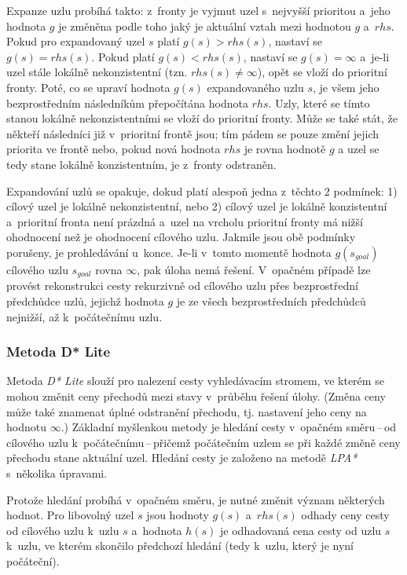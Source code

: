 Expanze uzlu probíhá takto: z~fronty je vyjmut uzel s~nejvyšší prioritou a~jeho hodnota $g$ je změněna podle toho jaký je aktuální vztah mezi hodnotou $g$ a~$rhs$. Pokud pro expandovaný uzel $s$ platí $g(s) > rhs(s)$, nastaví se $g(s) = rhs(s)$. Pokud platí $g(s) < rhs(s)$, nastaví se $g(s) = \infty$ a~je-li uzel stále lokálně nekonzistentní (tzn. $rhs(s) \neq \infty$), opět se vloží do prioritní fronty. Poté, co se upraví hodnota $g(s)$ expandovaného uzlu $s$, je všem jeho bezprostředním následníkům přepočítána hodnota $rhs$. Uzly, které se tímto stanou lokálně nekonzistentními se vloží do prioritní fronty. Může se také stát, že někteří následníci již v~prioritní frontě jsou; tím pádem se pouze změní jejich priorita ve frontě nebo, pokud nová hodnota $rhs$ je rovna hodnotě $g$ a uzel se tedy stane lokálně konzistentním, je z~fronty odstraněn.

Expandování uzlů se opakuje, dokud platí alespoň jedna z~těchto 2 podmínek: 1) cílový uzel je lokálně nekonzistentní, nebo 2) cílový uzel je lokálně konzistentní a~prioritní fronta není prázdná a~uzel na vrcholu prioritní fronty má nižší ohodnocení než je ohodnocení cílového uzlu. Jakmile jsou obě podmínky porušeny, je prohledávání u~konce. Je-li v~tomto momentě hodnota $g(s_{goal})$ cílového uzlu $s_{goal}$ rovna $\infty$, pak úloha nemá řešení. V~opačném případě lze provést rekonstrukci cesty rekurzivně od cílového uzlu přes bezprostřední předchůdce uzlů, jejichž hodnota $g$ je ze všech bezprostředních předchůdců nejnižší, až k~počátečnímu uzlu.

\subsubsection*{Metoda D* Lite}

Metoda \emph{D* Lite} \cite{D_star_lite} slouží pro nalezení cesty vyhledávacím stromem, ve kterém se mohou změnit ceny přechodů mezi stavy v~průběhu řešení úlohy. (Změna ceny může také znamenat úplné odstranění přechodu, tj. nastavení jeho ceny na hodnotu $\infty$.) Základní myšlenkou metody je hledání cesty v~opačném směru\,--\,od cílového uzlu k~počátečnímu\,--\,přičemž počátečním uzlem se při každé změně ceny přechodu stane aktuální uzel. Hledání cesty je založeno na metodě \emph{LPA*} s~několika úpravami.

Protože hledání probíhá v~opačném směru, je nutné změnit význam některých hodnot. Pro libovolný uzel $s$ jsou hodnoty $g(s)$ a~$rhs(s)$ odhady ceny cesty od cílového uzlu k~uzlu $s$ a~hodnota $h(s)$ je odhadovaná cena cesty od uzlu $s$ k~uzlu, ve kterém skončilo předchozí hledání (tedy k~uzlu, který je nyní počáteční).

